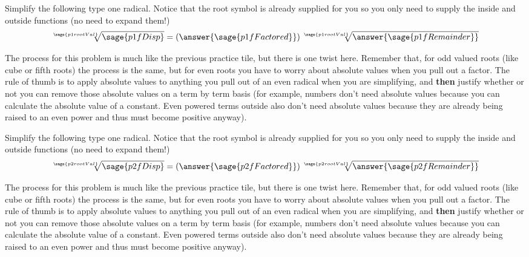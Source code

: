 \documentclass{ximera}
\begin{document}
\begin{problem}
    Simplify the following type one radical. Notice that the root symbol is already supplied for you so you only need to supply the inside and outside functions (no need to expand them!)
    \[
        \sqrt[\sage{p1rootVal}]{\sage{p1fDisp}} = \left(\answer{\sage{p1fFactored}}\right)\sqrt[\sage{p1rootVal}]{\answer{\sage{p1fRemainder}}}
    \]
    \begin{feedback}
        The process for this problem is much like the previous practice tile, but there is one twist here. Remember that, for odd valued roots (like cube or fifth roots) the process is the same, but for even roots you have to worry about absolute values when you pull out a factor. The rule of thumb is to apply absolute values to anything you pull out of an even radical when you are simplifying, and \textbf{then} justify whether or not you can remove those absolute values on a term by term basis (for example, numbers don't need absolute values because you can calculate the absolute value of a constant. Even powered terms outside also don't need absolute values because they are already being raised to an even power and thus must become positive anyway).
    \end{feedback}
\end{problem}

\begin{problem}
    Simplify the following type one radical. Notice that the root symbol is already supplied for you so you only need to supply the inside and outside functions (no need to expand them!)
    \[
        \sqrt[\sage{p2rootVal}]{\sage{p2fDisp}} = \left(\answer{\sage{p2fFactored}}\right)\sqrt[\sage{p2rootVal}]{\answer{\sage{p2fRemainder}}}
    \]
    \begin{feedback}
        The process for this problem is much like the previous practice tile, but there is one twist here. Remember that, for odd valued roots (like cube or fifth roots) the process is the same, but for even roots you have to worry about absolute values when you pull out a factor. The rule of thumb is to apply absolute values to anything you pull out of an even radical when you are simplifying, and \textbf{then} justify whether or not you can remove those absolute values on a term by term basis (for example, numbers don't need absolute values because you can calculate the absolute value of a constant. Even powered terms outside also don't need absolute values because they are already being raised to an even power and thus must become positive anyway).
    \end{feedback}
\end{problem}
\end{document}
